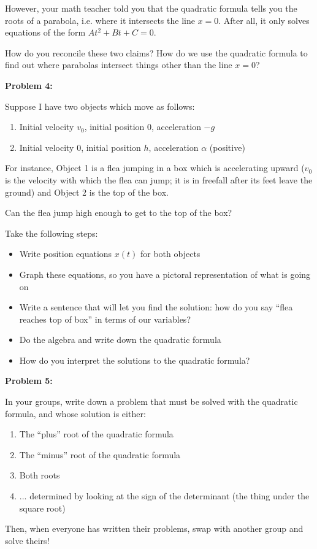 \documentclass[12pt]{article}
\newcommand{\BI}{\begin{itemize}}
\newcommand{\EI}{\end{itemize}}
\begin{document}
However, your math teacher told you that the quadratic formula tells you
the roots of a parabola, i.e. where it intersects the line $x=0$. 
After all, it only solves equations of the form $At^2 + Bt + C = 0$.

How do you reconcile these two claims? How do we use the quadratic formula
to find out where parabolas intersect things other than the line $x=0$?

\newpage

{\large \bf Problem 4:}

Suppose I have two objects which move as follows:

\begin{enumerate}
\item Initial velocity $v_0$, initial position 0, acceleration $-g$
\item Initial velocity $0$, initial position $h$, acceleration $\alpha$ (positive)
\end{enumerate}

For instance, Object 1 is a flea jumping in a box which is accelerating
upward ($v_0$ is the velocity with which the flea can jump; it is in freefall
after its feet leave the ground) and Object 2 is the top of the box.

Can the flea jump high enough to get to the top of the box?

Take the following steps:

\BI
\item Write position equations $x(t)$ for both objects
\item Graph these equations, so you have a pictoral representation of what is going on
\item Write a sentence that will let you find the solution: how do you say ``flea reaches top of box'' in terms of our variables?
\item Do the algebra and write down the quadratic formula
\item How do you interpret the solutions to the quadratic formula?
\EI


\newpage

{\large \bf Problem 5:}

In your groups, write down a problem that must be solved with the quadratic 
formula, and whose solution is either:

\begin{enumerate}
\item The ``plus'' root of the quadratic formula
\item The ``minus'' root of the quadratic formula
\item Both roots
\item ... determined by looking at the sign of the determinant (the thing under the square root)
\end{enumerate}

Then, when everyone has written their problems, swap with another group and
solve theirs!
\end{document}

